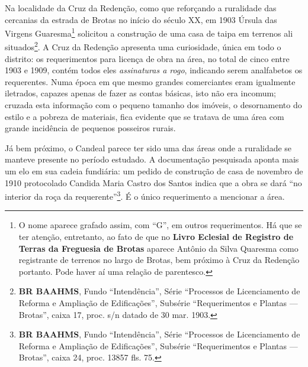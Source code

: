 Na localidade da Cruz da Redenção, como que reforçando a ruralidade das cercanias da estrada de Brotas no início do século XX, em 1903 Úrsula das Virgens Guaresma\footnote{O nome aparece grafado assim, com ``G'', em outros requerimentos. Há que se ter atenção, entretanto, ao fato de que no \textbf{Livro Eclesial de Registro de Terras da Freguesia de Brotas} aparece Antônio da Silva Quaresma como registrante de terrenos no largo de Brotas, bem próximo à Cruz da Redenção portanto. Pode haver aí uma relação de parentesco.} solicitou a construção de uma casa de taipa em terrenos ali situados\footnote{\textbf{BR BAAHMS}, Fundo ``Intendência'', Série ``Processos de Licenciamento de Reforma e Ampliação de Edificações'', Subsérie ``Requerimentos e Plantas --- Brotas'', caixa 17, proc. s/n datado de 30 mar. 1903.}. A Cruz da Redenção apresenta uma curiosidade, única em todo o distrito: os requerimentos para licença de obra na área, no total de cinco entre 1903 e 1909, contém todos eles \textit{assinaturas a rogo}, indicando serem analfabetos os requerentes. Numa época em que mesmo grandes comerciantes eram igualmente iletrados, capazes apenas de fazer as contas básicas, isto não era incomum; cruzada esta informação com o pequeno tamanho dos imóveis, o desornamento do estilo e a pobreza de materiais, fica evidente que se tratava de uma área com grande incidência de pequenos posseiros rurais. 

Já bem próximo, o Candeal parece ter sido uma das áreas onde a ruralidade se manteve presente no período estudado. A documentação pesquisada aponta mais um elo em  sua cadeia fundiária: um pedido de construção de casa de novembro de 1910 protocolado Candida Maria Castro dos Santos indica que a obra se dará ``no interior da roça da requerente''\footnote{\textbf{BR BAAHMS}, Fundo ``Intendência'', Série ``Processos de Licenciamento de Reforma e Ampliação de Edificações'', Subsérie ``Requerimentos e Plantas --- Brotas'', caixa 24, proc. 13857 fls. 75.}. É o único requerimento a mencionar a área.

